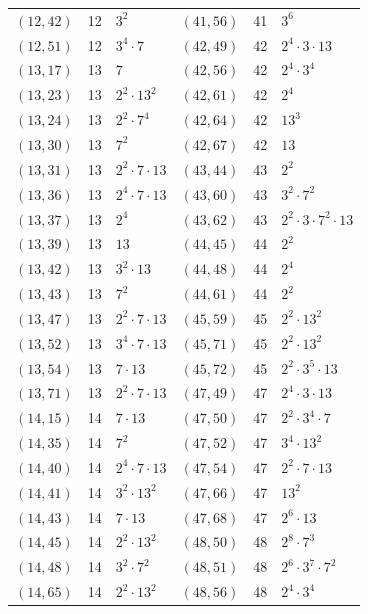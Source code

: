 \documentclass[11pt]{article}
\begin{document}
\begin{longtable}{@{}lrl@{\qquad}lrl@{}}
$(12,42)$ & 12 & $3^{2}$ & $(41,56)$ & 41 & $3^{6}$\\
$(12,51)$ & 12 & $3^{4}\cdot 7$ & $(42,49)$ & 42 & $2^{4}\cdot 3\cdot 13$\\
$(13,17)$ & 13 & $7$ & $(42,56)$ & 42 & $2^{4}\cdot 3^{4}$\\
$(13,23)$ & 13 & $2^{2}\cdot 13^{2}$ & $(42,61)$ & 42 & $2^{4}$\\
$(13,24)$ & 13 & $2^{2}\cdot 7^{4}$ & $(42,64)$ & 42 & $13^{3}$\\
$(13,30)$ & 13 & $7^{2}$ & $(42,67)$ & 42 & $13$\\
$(13,31)$ & 13 & $2^{2}\cdot 7\cdot 13$ & $(43,44)$ & 43 & $2^{2}$\\
$(13,36)$ & 13 & $2^{4}\cdot 7\cdot 13$ & $(43,60)$ & 43 & $3^{2}\cdot 7^{2}$\\
$(13,37)$ & 13 & $2^{4}$ & $(43,62)$ & 43 & $2^{2}\cdot 3\cdot 7^{2}\cdot 13$\\
$(13,39)$ & 13 & $13$ & $(44,45)$ & 44 & $2^{2}$\\
$(13,42)$ & 13 & $3^{2}\cdot 13$ & $(44,48)$ & 44 & $2^{4}$\\
$(13,43)$ & 13 & $7^{2}$ & $(44,61)$ & 44 & $2^{2}$\\
$(13,47)$ & 13 & $2^{2}\cdot 7\cdot 13$ & $(45,59)$ & 45 & $2^{2}\cdot 13^{2}$\\
$(13,52)$ & 13 & $3^{4}\cdot 7\cdot 13$ & $(45,71)$ & 45 & $2^{2}\cdot 13^{2}$\\
$(13,54)$ & 13 & $7\cdot 13$ & $(45,72)$ & 45 & $2^{2}\cdot 3^{5}\cdot 13$\\
$(13,71)$ & 13 & $2^{2}\cdot 7\cdot 13$ & $(47,49)$ & 47 & $2^{4}\cdot 3\cdot 13$\\
$(14,15)$ & 14 & $7\cdot 13$ & $(47,50)$ & 47 & $2^{2}\cdot 3^{4}\cdot 7$\\
$(14,35)$ & 14 & $7^{2}$ & $(47,52)$ & 47 & $3^{4}\cdot 13^{2}$\\
$(14,40)$ & 14 & $2^{4}\cdot 7\cdot 13$ & $(47,54)$ & 47 & $2^{2}\cdot 7\cdot 13$\\
$(14,41)$ & 14 & $3^{2}\cdot 13^{2}$ & $(47,66)$ & 47 & $13^{2}$\\
$(14,43)$ & 14 & $7\cdot 13$ & $(47,68)$ & 47 & $2^{6}\cdot 13$\\
$(14,45)$ & 14 & $2^{2}\cdot 13^{2}$ & $(48,50)$ & 48 & $2^{8}\cdot 7^{3}$\\
$(14,48)$ & 14 & $3^{2}\cdot 7^{2}$ & $(48,51)$ & 48 & $2^{6}\cdot 3^{7}\cdot 7^{2}$\\
$(14,65)$ & 14 & $2^{2}\cdot 13^{2}$ & $(48,56)$ & 48 & $2^{4}\cdot 3^{4}$\\

\end{longtable}
\end{document}
